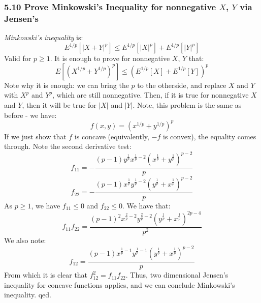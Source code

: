 \documentclass[12pt,a4paper]{article}
\newcommand{\1}[1]{\mathbbm{1}\left\{ #1 \right\}}
\begin{document}
\subsubsection{5.10 Prove Minkowski's Inequality for nonnegative $X$, $Y$ via Jensen's} \textit{Minkowski's inequality} is:
$$
	E^{1/p}[|X + Y|^p] \leq E^{1/p}[|X|^p] + E^{1/p}[|Y|^p]
$$
Valid for $p \geq 1$. It is enough to prove for nonnegative $X$, $Y$ that:
$$
	E[(X^{1/p} + Y^{1/p})^p] \leq (E^{1/p}[X] + E^{1/p}[Y])^p
$$
Note why it is enough: we can bring the $p$ to the otherside, and replace $X$ and $Y$ with $X^p$ and $Y^p$, which are still nonnegative. Then, if it is true for nonnegative $X$ and $Y$, then it will be true for $|X|$ and $|Y|$. Note, this problem is the same as before - we have:
$$
	f(x,y) = (x^{1/p} + y^{1/p})^p
$$
If we just show that $f$ is concave (equivalently, $-f$ is convex), the equality comes through. Note the second derivative test:
$$
	f_{11} = -\frac{\left(p - 1\right) y^{\frac{1}{p}} x^{\frac{1}{p} - 2} \left(x^{\frac{1}{p}} + y^{\frac{1}{p}}\right)^{p - 2}}{p}
$$
$$
	f_{22} = -\frac{\left(p - 1\right) x^{\frac{1}{p}} y^{\frac{1}{p} - 2} \left(y^{\frac{1}{p}} + x^{\frac{1}{p}}\right)^{p - 2}}{p}
$$
As $p \geq 1$, we have $f_{11} \leq 0$ and $f_{22} \leq 0$. We have that:
$$
	f_{11}f_{22} = \frac{\left(p - 1\right)^{2} x^{\frac{2}{p} - 2} y^{\frac{2}{p} - 2} \left(y^{\frac{1}{p}} + x^{\frac{1}{p}}\right)^{2p - 4}}{p^{2}}
$$
We also note:
$$
	f_{12} = \frac{\left(p - 1\right) x^{\frac{1}{p} - 1} y^{\frac{1}{p} - 1} \left(y^{\frac{1}{p}} + x^{\frac{1}{p}}\right)^{p - 2}}{p}
$$
From which it is clear that $f_{12}^2 = f_{11}f_{22}$. Thus, two dimensional Jensen's inequality for concave functions applies, and we can conclude Minkowski's inequality. qed.
\end{document}
